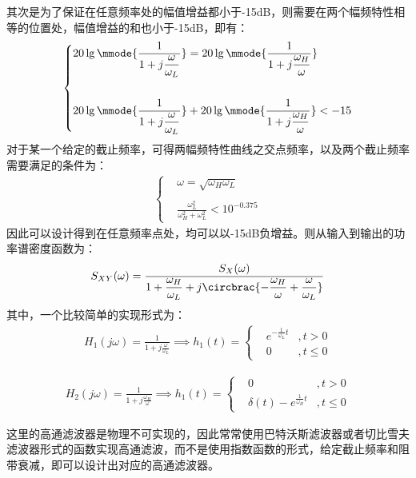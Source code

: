 \documentclass[11pt]{article}
\begin{document}
其次是为了保证在任意频率处的幅值增益都小于-15dB，则需要在两个幅频特性相等的位置处，幅值增益的和也小于-15dB，即有：
\begin{align}
  \left\{
  \begin{aligned}
     & 20\lg\mmode{\frac{1}{\displaystyle 1+j\frac{\omega}{\omega_L}}}=20\lg\mmode{\frac{1}{\displaystyle 1+j\frac{\omega_H}{\omega}}}     \\\\
     & 20\lg\mmode{\frac{1}{\displaystyle 1+j\frac{\omega}{\omega_L}}}+20\lg\mmode{\frac{1}{\displaystyle 1+j\frac{\omega_H}{\omega}}}<-15
  \end{aligned}
  \right.
\end{align}
对于某一个给定的截止频率，可得两幅频特性曲线之交点频率，以及两个截止频率需要满足的条件为：
\begin{align*}
  \left\{
  \begin{aligned}
     & \omega=\sqrt{\omega_H\omega_L}                       \\\\
     & \frac{\omega_L^2}{\omega_H^2+\omega_L^2}<10^{-0.375}
  \end{aligned}
  \right.
\end{align*}
因此可以设计得到在任意频率点处，均可以以-15dB负增益。则从输入到输出的功率谱密度函数为：
\begin{align*}
  S_{XY}(\omega)=\frac{S_X(\omega)}{\displaystyle 1+\frac{\omega_H}{\omega_L}+j\circbrac{-\frac{\omega_H}{\omega}+\frac{\omega}{\omega_L}}}
\end{align*}
其中，一个比较简单的实现形式为：
\begin{align*}
  H_1(j\omega)=\frac{1}{\displaystyle 1+j\frac{\omega}{\omega_L}} \implies h_1(t)=\left\{
  \begin{aligned}
     & e^{\displaystyle -\frac{1}{\omega_L}t} & ,  t>0   \\
     & 0                                      & ,  t\le0
  \end{aligned}
  \right.
\end{align*}

\begin{align*}
  H_2(j\omega)=\frac{1}{\displaystyle 1+j\frac{\omega_H}{\omega}} \implies h_1(t)=\left\{
  \begin{aligned}
     & 0                                               & , t>0   \\
     & \delta(t)-e^{\displaystyle \frac{1}{\omega_H}t} & , t\le0
  \end{aligned}
  \right.
\end{align*}\par
这里的高通滤波器是物理不可实现的，因此常常使用巴特沃斯滤波器或者切比雪夫滤波器形式的函数实现高通滤波，而不是使用指数函数的形式，给定截止频率和阻带衰减，即可以设计出对应的高通滤波器。
\end{document}
